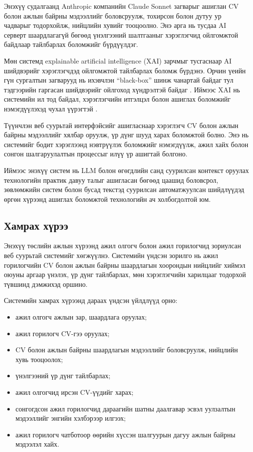 \par{}Энэхүү судалгаанд Anthropic компанийн Claude Sonnet загварыг ашиглан CV болон ажлын байрны мэдээллийг боловсруулж, тохирсон болон дутуу ур чадварыг тодорхойлж, нийцлийн хувийг тооцоолно. Энэ арга нь тусдаа AI серверт шаардлагагүй бөгөөд үнэлгээний шалтгааныг хэрэглэгчид ойлгомжтой байдлаар тайлбарлах боломжийг бүрдүүлдэг.

\par{}Мөн системд explainable artificial intelligence (XAI) зарчмыг тусгаснаар AI шийдвэрийг хэрэглэгчдэд ойлгомжтой тайлбарлах боломж бүрдэнэ. Орчин үеийн гүн сургалтын загварууд нь ихэвчлэн “black-box” шинж чанартай байдаг тул тэдгээрийн гаргасан шийдвэрийг ойлгоход хүндрэлтэй байдаг . Иймээс XAI нь системийн ил тод байдал, хэрэглэгчийн итгэлцэл болон ашиглах боломжийг нэмэгдүүлэхэд чухал үүрэгтэй \cite{arrieta2020xai,adadi2018xai}.

\par{}Түүнчлэн веб суурьтай интерфэйсийг ашигласнаар хэрэглэгч CV болон ажлын байрны мэдээллийг хялбар оруулж, үр дүнг шууд харах боломжтой болно. Энэ нь системийг бодит хэрэглээнд нэвтрүүлэх боломжийг нэмэгдүүлж, ажил хайх болон сонгон шалгаруулалтын процессыг илүү үр ашигтай болгоно.

\par{}Иймээс энэхүү систем нь LLM болон өгөгдлийн санд суурилсан контекст оруулах технологийн практик давуу талыг ашигласан бөгөөд цаашид боловсрол, зөвлөмжийн систем болон бусад текстэд суурилсан автоматжуулсан шийдлүүдэд өргөн хүрээнд ашиглах боломжтой технологийн ач холбогдолтой юм.


\subsection*{Хамрах хүрээ}

\par{}Энэхүү төслийн ажлын хүрээнд ажил олгогч болон ажил горилогчид зориулсан веб суурьтай системийг хөгжүүлнэ. Системийн үндсэн зорилго нь ажил горилогчийн CV болон ажлын байрны шаардлагын хоорондын нийцлийг хиймэл оюуны аргаар үнэлэх, үр дүнг тайлбарлах, мөн хэрэглэгчийн харилцааг тодорхой түвшинд дэмжихэд оршино.

Системийн хамрах хүрээнд дараах үндсэн үйлдлүүд орно:
\begin{itemize}
    \item ажил олгогч ажлын зар, шаардлага оруулах;
    \item ажил горилогч CV-гээ оруулах;
    \item CV болон ажлын байрны шаардлагын мэдээллийг боловсруулж, нийцлийн хувь тооцоолох;
    \item үнэлгээний үр дүнг тайлбарлах;
    \item ажил олгогчид ирсэн CV-үүдийг харах;
    \item сонгогдсон ажил горилогчид дараагийн шатны даалгавар эсвэл уулзалтын мэдээллийг энгийн хэлбэрээр илгээх;
    \item ажил горилогч чатботоор өөрийн хүссэн шалгуурын дагуу ажлын байрны мэдээлэл хайх.
\end{itemize}

